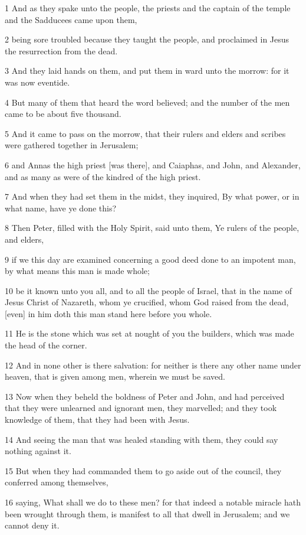 \par 1 And as they spake unto the people, the priests and the captain of the temple and the Sadducees came upon them,
\par 2 being sore troubled because they taught the people, and proclaimed in Jesus the resurrection from the dead.
\par 3 And they laid hands on them, and put them in ward unto the morrow: for it was now eventide.
\par 4 But many of them that heard the word believed; and the number of the men came to be about five thousand.
\par 5 And it came to pass on the morrow, that their rulers and elders and scribes were gathered together in Jerusalem;
\par 6 and Annas the high priest [was there], and Caiaphas, and John, and Alexander, and as many as were of the kindred of the high priest.
\par 7 And when they had set them in the midst, they inquired, By what power, or in what name, have ye done this?
\par 8 Then Peter, filled with the Holy Spirit, said unto them, Ye rulers of the people, and elders,
\par 9 if we this day are examined concerning a good deed done to an impotent man, by what means this man is made whole;
\par 10 be it known unto you all, and to all the people of Israel, that in the name of Jesus Christ of Nazareth, whom ye crucified, whom God raised from the dead, [even] in him doth this man stand here before you whole.
\par 11 He is the stone which was set at nought of you the builders, which was made the head of the corner.
\par 12 And in none other is there salvation: for neither is there any other name under heaven, that is given among men, wherein we must be saved.
\par 13 Now when they beheld the boldness of Peter and John, and had perceived that they were unlearned and ignorant men, they marvelled; and they took knowledge of them, that they had been with Jesus.
\par 14 And seeing the man that was healed standing with them, they could say nothing against it.
\par 15 But when they had commanded them to go aside out of the council, they conferred among themselves,
\par 16 saying, What shall we do to these men? for that indeed a notable miracle hath been wrought through them, is manifest to all that dwell in Jerusalem; and we cannot deny it.
